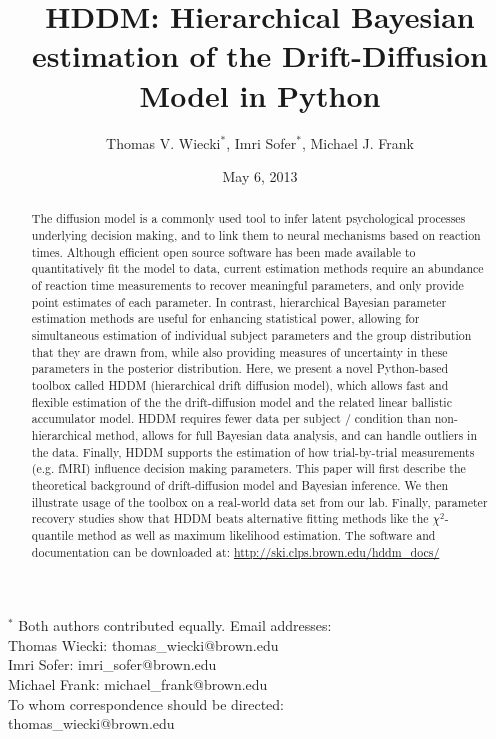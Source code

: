 \documentclass[letterpaper,10pt,english]{article}
\title{HDDM: Hierarchical Bayesian estimation of the Drift-Diffusion
Model in Python}
\date{May 6, 2013}
\author{Thomas V. Wiecki$^\ast$, Imri Sofer$^\ast$, Michael J. Frank}
\begin{document}
\maketitle

$^\ast$ Both authors contributed equally.
Email addresses:\\
Thomas Wiecki: thomas\_wiecki@brown.edu\\
Imri Sofer: imri\_sofer@brown.edu\\
Michael Frank: michael\_frank@brown.edu\\

To whom correspondence should be directed:\\
thomas\_wiecki@brown.edu\\
\begin{abstract}
\label{abstract:abstract}
The diffusion model is a commonly used tool to infer latent
psychological processes underlying decision making, and to link them
to neural mechanisms based on reaction times. Although efficient open
source software has been made available to quantitatively fit the
model to data, current estimation methods require an abundance of
reaction time measurements to recover meaningful parameters, and only
provide point estimates of each parameter.  In contrast, hierarchical
Bayesian parameter estimation methods are useful for enhancing
statistical power, allowing for simultaneous estimation of individual
subject parameters and the group distribution that they are drawn
from, while also providing measures of uncertainty in these parameters
in the posterior distribution. Here, we present a novel Python-based
toolbox called HDDM (hierarchical drift diffusion model), which allows
fast and flexible estimation of the the drift-diffusion model and the
related linear ballistic accumulator model. HDDM requires fewer data
per subject / condition than non-hierarchical method, allows for full
Bayesian data analysis, and can handle outliers in the data.  Finally,
HDDM supports the estimation of how trial-by-trial measurements (e.g.
fMRI) influence decision making parameters. This paper will first
describe the theoretical background of drift-diffusion model and
Bayesian inference. We then illustrate usage of the toolbox on a
real-world data set from our lab. Finally, parameter recovery studies
show that HDDM beats alternative fitting methods like the
$\chi^2$-quantile method as well as maximum likelihood estimation. The
software and documentation can be downloaded at:
\href{http://ski.clps.brown.edu/hddm\_docs/}{http://ski.clps.brown.edu/hddm\_docs/}
\end{abstract}
\end{document}
